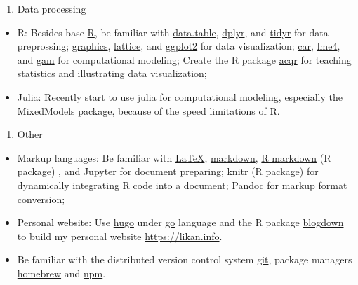 \documentclass[
  12pt,
]{article}
\providecommand{\tightlist}{%
  \setlength{\itemsep}{0pt}\setlength{\parskip}{0pt}}
\begin{document}
\begin{enumerate}
\def\labelenumi{\arabic{enumi}.}
\setcounter{enumi}{1}
\tightlist
\item
  Data processing
\end{enumerate}

\begin{itemize}
\item
  R: Besides base \href{https://www.r-project.org}{R}, be familiar with
  \href{http://r-datatable.com}{data.table},
  \href{https://cran.r-project.org/web/packages/dplyr/index.html}{dplyr},
  and
  \href{https://cran.r-project.org/web/packages/tidyr/index.html}{tidyr}
  for data preprossing;
  \href{https://stat.ethz.ch/R-manual/R-devel/library/graphics/html/00Index.html}{graphics},
  \href{https://cran.r-project.org/package=lattice}{lattice}, and
  \href{http://ggplot2.tidyverse.org}{ggplot2} for data visualization;
  \href{https://cran.r-project.org/web/packages/car/index.html}{car},
  \href{https://github.com/lme4/lme4}{lme4}, and
  \href{https://cran.r-project.org/web/packages/gam/index.html}{gam} for
  computational modeling; Create the R package
  \href{https://github.com/likanzhan/acqr}{acqr} for teaching statistics
  and illustrating data visualization;
\item
  Julia: Recently start to use \href{https://julialang.org}{julia} for
  computational modeling, especially the
  \href{https://github.com/dmbates/MixedModels.jl}{MixedModels} package,
  because of the speed limitations of R.
\end{itemize}

\begin{enumerate}
\def\labelenumi{\arabic{enumi}.}
\setcounter{enumi}{2}
\tightlist
\item
  Other
\end{enumerate}

\begin{itemize}
\item
  Markup languages: Be familiar with
  \href{https://www.latex-project.org}{LaTeX},
  \href{https://daringfireball.net/projects/markdown/}{markdown},
  \href{https://rmarkdown.rstudio.com}{R markdown} (R package) , and
  \href{https://jupyter.org}{Jupyter} for document preparing;
  \href{https://cran.r-project.org/web/packages/knitr/index.html}{knitr}
  (R package) for dynamically integrating R code into a document;
  \href{https://pandoc.org}{Pandoc} for markup format conversion;
\item
  Personal website: Use \href{https://gohugo.io}{hugo} under
  \href{https://golang.org}{go} language and the R package
  \href{https://github.com/rstudio/blogdown}{blogdown} to build my
  personal website \url{https://likan.info}.
\item
  Be familiar with the distributed version control system
  \href{https://git-scm.com}{git}, package managers
  \href{https://brew.sh}{homebrew} and
  \href{https://www.npmjs.com}{npm}.
\end{itemize}
\end{document}
